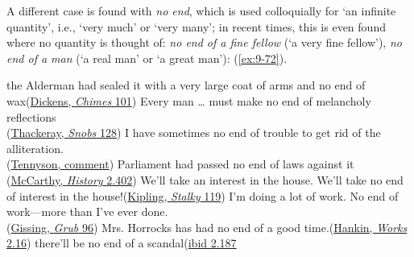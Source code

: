 A different case is found with \textit{no end}, which is used colloquially for `an infinite quantity', i.e., `very much' or `very many'; in recent times, this is even found where no quantity is thought of: \textit{no end of a fine fellow} (`a very fine fellow'), \textit{no end of a man} (`a real man' or `a great man'): (\ref{ex:9-72}).

\ea \label{ex:9-72}
\ea the Alderman had sealed it with a very large coat of arms and no end of wax\hfill(\href{https://archive.org/details/chimes00dick/page/78/mode/2up?q=%22large+coat%22&view=theater}{Dickens, \textit{Chimes} 101})
\ex Every man {\dots} must make no end of melancholy reflections\\\hfill(\href{https://archive.org/details/in.ernet.dli.2015.61330/page/n223/mode/2up?q=%22melancholy+reflections%22&view=theater}{Thackeray, \textit{Snobs} 128}) %
\ex I have sometimes no end of trouble to get rid of the alliteration.\\\hfill(\href{https://archive.org/details/alfredlordtenny05tenngoog/page/n558/mode/2up?q=%22no+end+of+trouble%22&view=theater}{Tennyson, comment})
\ex Parliament had passed no end of laws against it\\\hfill(\href{https://books.google.co.jp/books?id=9PjnkXA5jOkC&pg=PP5&dq=%22justin+mccarthy%22+%22our+own+times%22&hl=en&newbks=1&newbks_redir=0&sa=X&ved=2ahUKEwiE2YnrmaCFAxVsoa8BHcesDZwQ6AF6BAgKEAI#v=snippet&q=%22parliament%20had%20passed%20no%20end%22&f=false}{McCarthy, \textit{History} 2.402})
\ex We'll take an interest in the house. We'll take no end of interest in the house!\hfill(\href{https://archive.org/details/stalkyandco015455mbp/page/n115/mode/2up?q=%22interest+in+the+house%22&view=theater}{Kipling, \textit{Stalky} 119})
\ex I'm doing a lot of work. No end of work---more than I've ever done.\\\hfill(\href{https://archive.org/details/newgrubstreetnov01gissuoft/page/198/mode/2up?q=%22doing+a+lot+of+work+%22&view=theater}{Gissing, \textit{Grub} 96})
\ex Mrs. Horrocks has had no end of a good time.\hfill(\href{https://archive.org/details/dramaticworksofs02hank/page/12/mode/2up?q=%22has+had+no+end+of%22&view=theater}{Hankin, \textit{Works} 2.16})
\ex there'll be no end of a scandal\hfill(\href{https://archive.org/details/dramaticworksofs02hank/page/188/mode/2up?q=%22no+end%22&view=theater}{ibid 2.187}%
